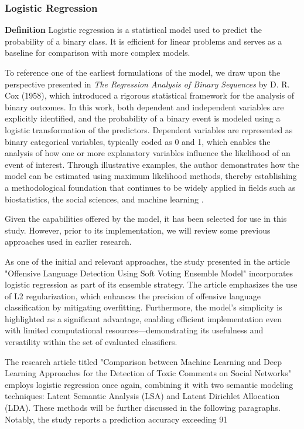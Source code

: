 \subsubsection{Logistic Regression}
\textbf{Definition}
Logistic regression is a statistical model used to predict the probability of a binary class. It is efficient for linear problems and serves as a baseline for comparison with more complex models.

To reference one of the earliest formulations of the model, we draw upon the perspective presented in \textit{The Regression Analysis of Binary Sequences} by D. R. Cox (1958), which introduced a rigorous statistical framework for the analysis of binary outcomes. In this work, both dependent and independent variables are explicitly identified, and the probability of a binary event is modeled using a logistic transformation of the predictors. Dependent variables are represented as binary categorical variables, typically coded as 0 and 1, which enables the analysis of how one or more explanatory variables influence the likelihood of an event of interest. Through illustrative examples, the author demonstrates how the model can be estimated using maximum likelihood methods, thereby establishing a methodological foundation that continues to be widely applied in fields such as biostatistics, the social sciences, and machine learning \citep{cox1958logistic}.

Given the capabilities offered by the model, it has been selected for use in this study. However, prior to its implementation, we will review some previous approaches used in earlier research.

As one of the initial and relevant approaches, the study presented in the article "Offensive Language Detection Using Soft Voting Ensemble Model" \citep{supert2023offensive} incorporates logistic regression as part of its ensemble strategy. The article emphasizes the use of L2 regularization, which enhances the precision of offensive language classification by mitigating overfitting. Furthermore, the model's simplicity is highlighted as a significant advantage, enabling efficient implementation even with limited computational resources—demonstrating its usefulness and versatility within the set of evaluated classifiers.

The research article titled "Comparison between Machine Learning and Deep Learning Approaches for the Detection of Toxic Comments on Social Networks" \citep{bonetti2023comparison} employs logistic regression once again, combining it with two semantic modeling techniques: Latent Semantic Analysis (LSA) and Latent Dirichlet Allocation (LDA). These methods will be further discussed in the following paragraphs. Notably, the study reports a prediction accuracy exceeding 91%
